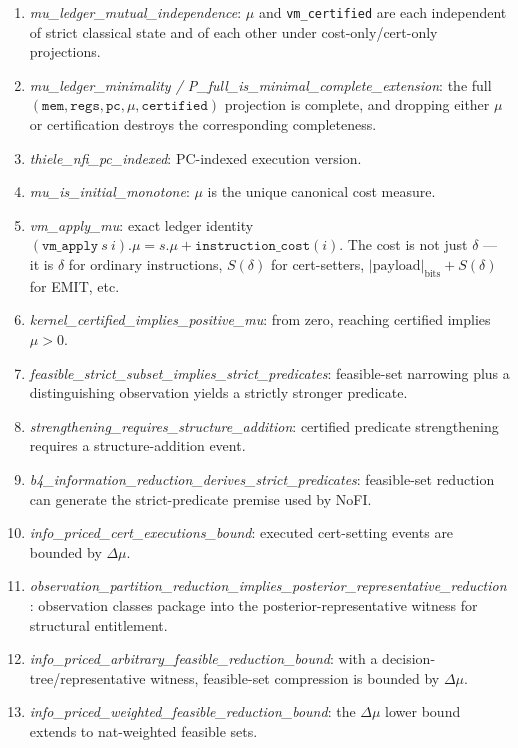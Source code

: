 \documentclass[11pt,a4paper]{article}
\theoremstyle{plain}
\theoremstyle{definition}
\theoremstyle{remark}
\begin{document}
{\begin{enumerate}
\item \textit{\small mu\_ledger\_mutual\_independence}: $\mu$ and \texttt{vm\_certified} are each independent of strict classical state and of each other under cost-only/cert-only projections.
\item \textit{\small mu\_ledger\_minimality / P\_full\_is\_minimal\_complete\_extension}: the full $(\texttt{mem}, \texttt{regs}, \texttt{pc}, \mu, \texttt{certified})$ projection is complete, and dropping either $\mu$ or certification destroys the corresponding completeness.
\item \textit{\small thiele\_nfi\_pc\_indexed}: PC-indexed execution version.
\item \textit{\small mu\_is\_initial\_monotone}: $\mu$ is the unique canonical cost measure.
\item \textit{\small vm\_apply\_mu}: exact ledger identity $(\texttt{vm\_apply}~s~i).\mu = s.\mu + \texttt{instruction\_cost}(i)$. The cost is not just $\delta$ --- it is $\delta$ for ordinary instructions, $S(\delta)$ for cert-setters, $|\text{payload}|_{\text{bits}} + S(\delta)$ for EMIT, etc.
\item \textit{\small kernel\_certified\_implies\_positive\_mu}: from zero, reaching certified implies $\mu > 0$.
\item \textit{\small feasible\_strict\_subset\_implies\_strict\_predicates}: feasible-set narrowing plus a distinguishing observation yields a strictly stronger predicate.
\item \textit{\small strengthening\_requires\_structure\_addition}: certified predicate strengthening requires a structure-addition event.
\item \textit{\small b4\_information\_reduction\_derives\_strict\_predicates}: feasible-set reduction can generate the strict-predicate premise used by NoFI.
\item \textit{\small info\_priced\_cert\_executions\_bound}: executed cert-setting events are bounded by $\Delta\mu$.
\item \textit{\small observation\_partition\_reduction\_implies\_posterior\_representative\_reduction}: observation classes package into the posterior-representative witness for structural entitlement.
\item \textit{\small info\_priced\_arbitrary\_feasible\_reduction\_bound}: with a decision-tree/representative witness, feasible-set compression is bounded by $\Delta\mu$.
\item \textit{\small info\_priced\_weighted\_feasible\_reduction\_bound}: the $\Delta\mu$ lower bound extends to nat-weighted feasible sets.

\end{enumerate}}
\end{document}
